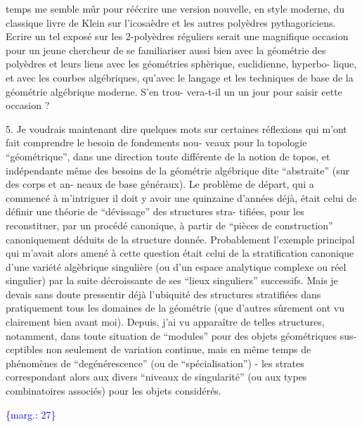 \documentclass[11pt]{article}
\newcommand{\scanpage}[1]{\par\bigskip\noindent{\small\sffamily[scan #1]}\par}
\newcommand{\mspage}[1]{{\small\sffamily[p.\,#1]}}
\newcommand{\margin}[1]{\textcolor{blue}{\{\textsf{marg.:} #1\}}}
\begin{document}
temps me semble mûr pour réécrire une version nouvelle, en style
moderne, du classique livre de Klein sur l'icosaèdre et les autres
polyèdres pythagoriciens. Ecrire un tel exposé sur les 2-polyèdres
réguliers serait une magnifique occasion pour un jeune chercheur
de se familiariser aussi bien avec la géométrie des polyèdres et
leurs liens avec les géométries sphèrique, euclidienne, hyperbo-%
lique, et avec les courbes algébriques, qu'avec le langage et les
techniques de base de la géométrie algébrique moderne. S'en trou-%
vera-t-il un un jour pour saisir cette occasion ?

5. \qquad Je voudrais maintenant dire quelques mots sur certaines
réflexions qui m'ont fait comprendre le besoin de fondements nou-%
veaux pour la topologie ``géométrique'', dans une direction toute
différente de la notion de topos, et indépendante même des besoins
de la géométrie algébrique dite ``abstraite'' (sur des corps et an-%
neaux de base généraux). Le problème de départ, qui a commencé à
m'intriguer il doit y avoir une quinzaine d'années déjà, était
celui de définir une théorie de ``dévissage'' des structures stra-%
tifiées, pour les reconstituer, par un procédé canonique, à partir
de ``pièces de construction'' canoniquement déduits de la structure
donnée. Probablement l'exemple principal qui m'avait alors amené
à cette question était celui de la stratification canonique d'une
variété algèbrique singulière (ou d'un espace analytique complexe
ou réel singulier) par la suite décroissante de ses ``lieux singuliers''
successifs. Mais je devais sans doute pressentir déjà l'ubiquité
des structures stratifiées dans pratiquement tous les domaines de
la géométrie (que d'autres sûrement ont vu clairement bien avant
moi). Depuis, j'ai vu apparaître de telles structures, notamment,
dans toute situation de ``modules'' pour des objets géométriques sus-%
ceptibles non seulement de variation continue, mais en même temps
de phénomènes de ``degénérescence'' (ou de ``spécialisation'') - les
strates correspondant alors aux divers ``niveaux de singularité''
(ou aux types combinatoires associés) pour les objets considérés.

\margin{27}

\clearpage
\scanpage{119/28}
\mspage{26}
\end{document}

